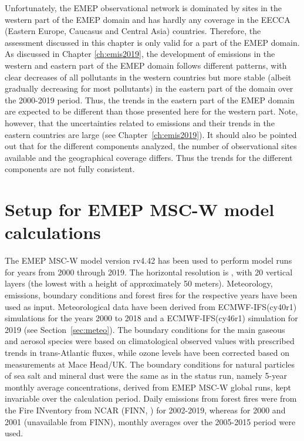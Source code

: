 Unfortunately, the EMEP observational network is dominated by sites in the western part of the EMEP domain and has hardly any coverage in the EECCA (Eastern Europe, Caucasus and Central Asia) countries. Therefore, the assessment discussed in this chapter is only valid for a part of the EMEP domain. As discussed in Chapter \ref{ch:emis2019}, the development of emissions in the western and eastern part of the EMEP domain follows different patterns, with clear decreases of all pollutants in the western countries but more stable (albeit gradually decreasing for most pollutants) in the eastern part of the domain over the 2000-2019 period. Thus, the trends in the eastern part of the EMEP domain are expected to be different than those presented here for the western part. Note, however, that the uncertainties related to emissions and their trends in the eastern countries are large (see Chapter~\ref{ch:emis2019}). It should also be pointed out that for the different components analyzed, the number of observational sites available and the geographical coverage differs. Thus the trends for the different components are not fully consistent. 




\section{\label{EMEPmodelcalc}{Setup for EMEP MSC-W model calculations}}

The EMEP MSC-W model version rv4.42 has been used to perform model runs for years from 2000 through 2019. The horizontal resolution is \resZO, with 20 vertical layers (the lowest with a height of approximately 50 meters).
 Meteorology, emissions, boundary conditions and forest fires for the respective years have been used as input. Meteorological data have been
 derived from ECMWF-IFS(cy40r1) simulations for the years 2000 to 2018 and a ECMWF-IFS(cy46r1) simulation for 2019 (see Section~\ref{sec:meteo}). 
 The boundary conditions for the main gaseous and aerosol species were based on climatological observed values with prescribed trends in trans-Atlantic fluxes, while ozone levels have been corrected based on measurements at Mace
Head/UK. The boundary conditions for natural particles of
sea salt and mineral dust were the same as in the status run, namely 5-year monthly average
concentrations, derived from EMEP MSC-W global runs, kept invariable over the calculation
period.
Daily emissions from forest fires were from the Fire INventory from NCAR (FINN, \citealt{Wiedinmyer2011}) for 2002-2019,
whereas for 2000 and 2001 (unavailable from FINN), monthly averages over the 2005-2015 period were
used.

